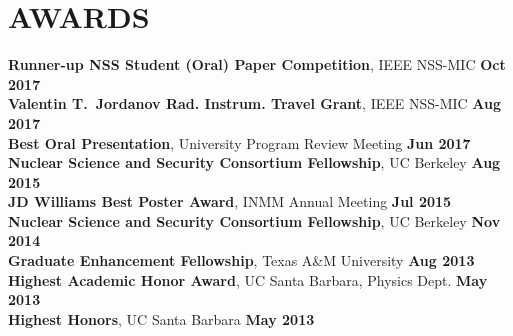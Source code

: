 \section{\small{AWARDS}}

{\bf Runner-up NSS Student (Oral) Paper Competition}, IEEE NSS-MIC \hfill {\bf Oct 2017}\\
{\bf Valentin T.~Jordanov Rad. Instrum. Travel Grant}, IEEE NSS-MIC \hfill {\bf Aug 2017}\\
{\bf Best Oral Presentation}, University Program Review Meeting \hfill {\bf Jun 2017}\\
{\bf Nuclear Science and Security Consortium Fellowship}, UC Berkeley \hfill {\bf Aug 2015}\\
{\bf JD Williams Best Poster Award}, INMM Annual Meeting \hfill {\bf Jul 2015}\\
{\bf Nuclear Science and Security Consortium Fellowship}, UC Berkeley \hfill {\bf Nov 2014}\\
{\bf Graduate Enhancement Fellowship}, Texas A\&M University \hfill {\bf Aug 2013}\\
{\bf Highest Academic Honor Award}, UC Santa Barbara, Physics Dept. \hfill {\bf May 2013}\\
{\bf Highest Honors}, UC Santa Barbara \hfill {\bf May 2013}

